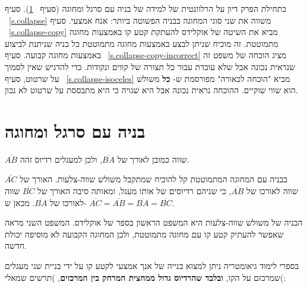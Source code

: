 \begin{figure}
{
}
\end{figure}

בתחילת הפרק דיון על הרלוונטית של למידה של בניה עם סרגל ומחוגה (סעיף%
~\ref{s.relevance}).
סעיף%
~\ref{s.collapse} 
משווה את שני סוגי המחוגה בבניה הפשוטה ביותר: אנח אמצעי. סעיף%
~\ref{s.collapse-copy}
מביא את השיטה של אוקלידס להעתקת קטע קו באמצעות מחוגה מתמוטטת. זה מוכיח שניתן לבצע באמצעות מחוגה מתמוטטת כל בניה שניתנת לביצוע באמצעות מחוגה קבועה. סעיף%
~\ref{s.collapse-copy-incorrect} 
מציג הוכחה של משפט זה שנראית נכונה אבל שלא עובדת עבור כל תצורה של קווים ונקודות. כדי להדגיש שאין לסמוך על שרטוט, סעיף%
~\ref{s.collapse-isoceles}
מביא "הוכחה לכאורה" מפורסמת ש-
\textbf{כל}
משולש הוא שווי שוקיים. ההוכחה נראית נכונה אבל היא שגויה כי היא מתבססת על שרטוט לא נכון.


\section{בניה עם סרגל ומחוגה}\label{s.relevance}

$\overline{AB}$
שווה כמובן לאורך של
$\overline{BA}$,
ולכן למעגלים רדיוס זהה.

בבניה עם המחוגה המתמוטטת קל להוכיח שמתקבל משולש שווה-צלעות. האורך של
$\overline{AC}$
שווה לאורכו של
$\overline{AB}$,
כי שניהם רדיוסים של אותו מעגל, ומאותה סיבה האורך של
$\overline{BC}$
שווה לאורכו של
$\overline{BA}$.
מכאן ש-%
$\overline{AC} = \overline{AB} = \overline{BA} = \overline{BC}$.

הבניה של משולש שווה-צלעות היא המשפט הראשון בספר של אוקלידס. המשפט השני מראה שאפשר להעתיק קטע קו עם מחוגה מתמוטטת, ולכן המחוגה הקבועה לא מוסיפה יכולת חדשה. 

בספרי לימוד גיאומטריה ניתן למצוא בנייה של אנך אמצעי לקטע קו על ידי בניית שני מעגלים שמרכזם על הקו, 
\textbf{ובלבד שהרדיוס גדול ממחצית המרחק בין המרכזים},
)תרשים שמאלי(:

